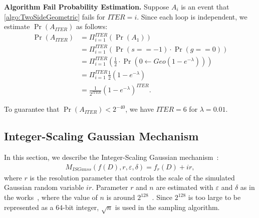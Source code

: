 \textbf{Algorithm Fail Probability Estimation. }
Suppose $A_i$ is an event that \autoref{algo:TwoSideGeometric} fails for $ITER=i$.
Since each loop is independent, we estimate $\Pr\left(A_{ITER}\right)$ as follows:
\begin{equation}
    \begin{split}
        \Pr\left(A_{ITER}\right) & = \Pi _{i=1}^{ITER}\left(\Pr\left(A_1\right) \right) \\
        &= \Pi _{i=1}^{ITER} \left(\Pr\left(s==-1\right)\cdot  \Pr\left(g==0\right) \right)\\
        &=       \Pi _{i=1}^{ITER} \left(\frac{1}{2}\cdot \Pr\left(0\gets Geo\left( 1-e^{-\lambda}  \right) \right)  \right)                   \\
        &= \Pi _{i=1}^{ITER} \frac{1}{2}  \left(1-e^{-\lambda}\right) \\
        &= \frac{1}{2^{ITER}}  \left(1-e^{-\lambda}\right)^{ITER}.
    \end{split}
\end{equation}

To guarantee that $\Pr\left(A_{ITER}\right)<2^{-40}$, we have $ITER = 6$ for $\lambda = 0.01$.




\subsection{Integer-Scaling Gaussian Mechanism}
\label{subsec:IntegerScalingGaussianMechanism}
In this section, we describe the Integer-Scaling Gaussian mechanism~\cite{googleDP2019}:
\begin{equation}
    \begin{split}
        M_{ISGauss}\left(f\left(D\right),r,\varepsilon,\delta\right)=f_r\left(D\right) +ir,
    \end{split}
\end{equation}
where $r$ is the resolution parameter that controls the scale of the simulated Gaussian random variable $ir$. Parameter $r$ and $n$ are estimated with $\varepsilon$ and $\delta$ as in the works~\cite{balle2018improving,googleDP2019}, where the value of $n$ is around $2^{128}$~\cite{googleDP2019}. Since $2^{128}$ is too large to be represented as a $64$-bit integer, $\sqrt{n}$ is used in the sampling algorithm.

